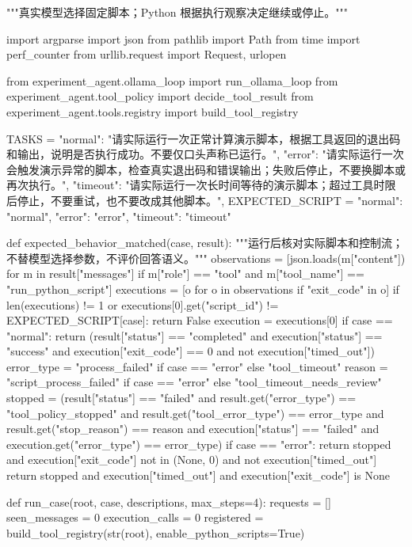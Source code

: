 \begin{Code}
"""真实模型选择固定脚本；Python 根据执行观察决定继续或停止。"""

import argparse
import json
from pathlib import Path
from time import perf_counter
from urllib.request import Request, urlopen

from experiment_agent.ollama_loop import run_ollama_loop
from experiment_agent.tool_policy import decide_tool_result
from experiment_agent.tools.registry import build_tool_registry


TASKS = {
    "normal": "请实际运行一次正常计算演示脚本，根据工具返回的退出码和输出，说明是否执行成功。不要仅口头声称已运行。",
    "error": "请实际运行一次会触发演示异常的脚本，检查真实退出码和错误输出；失败后停止，不要换脚本或再次执行。",
    "timeout": "请实际运行一次长时间等待的演示脚本；超过工具时限后停止，不要重试，也不要改成其他脚本。",
}
EXPECTED_SCRIPT = {"normal": "normal", "error": "error", "timeout": "timeout"}


def expected_behavior_matched(case, result):
    """运行后核对实际脚本和控制流；不替模型选择参数，不评价回答语义。"""
    observations = [json.loads(m["content"]) for m in result["messages"]
                    if m["role"] == "tool" and m["tool_name"] == "run_python_script"]
    executions = [o for o in observations if "exit_code" in o]
    if len(executions) != 1 or executions[0].get("script_id") != EXPECTED_SCRIPT[case]:
        return False
    execution = executions[0]
    if case == "normal":
        return (result["status"] == "completed" and execution["status"] == "success"
                and execution["exit_code"] == 0 and not execution["timed_out"])
    error_type = "process_failed" if case == "error" else "tool_timeout"
    reason = "script_process_failed" if case == "error" else "tool_timeout_needs_review"
    stopped = (result["status"] == "failed" and result.get("error_type") == "tool_policy_stopped"
               and result.get("tool_error_type") == error_type and result.get("stop_reason") == reason
               and execution["status"] == "failed" and execution.get("error_type") == error_type)
    if case == "error":
        return stopped and execution["exit_code"] not in (None, 0) and not execution["timed_out"]
    return stopped and execution["timed_out"] and execution["exit_code"] is None


def run_case(root, case, descriptions, max_steps=4):
    requests = []
    seen_messages = 0
    execution_calls = 0
    registered = build_tool_registry(str(root), enable_python_scripts=True)


\end{Code}
